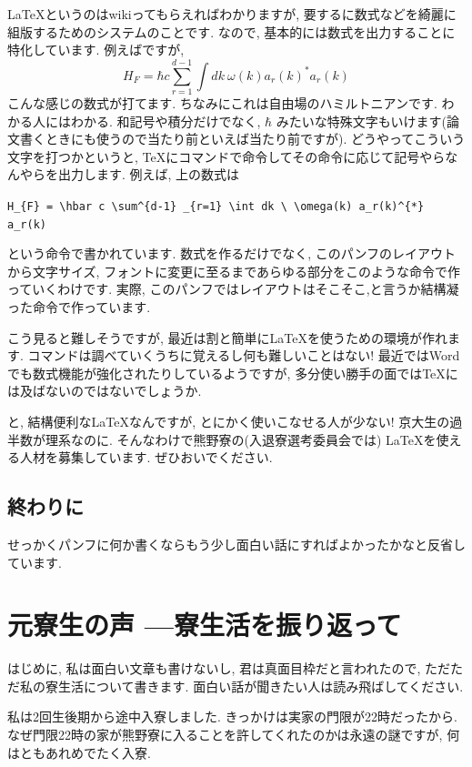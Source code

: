 \documentclass[10pt,b5jsbook,dvips,dvipdfmx,openany]{jsbook}
\theoremstyle{definition}
\begin{document}
		\LaTeX というのはwikiってもらえればわかりますが, 要するに数式などを綺麗に組版するためのシステムのことです. なので, 基本的には数式を出力することに特化しています. 例えばですが, 
		\[
     	 	H_{F} = \hbar c \sum^{d-1} _{r=1} \int dk \ \omega(k) a_r(k)^{*} a_r(k) 
      		\]
		こんな感じの数式が打てます. ちなみにこれは自由場のハミルトニアンです. わかる人にはわかる. 和記号や積分だけでなく, $ \hbar $ みたいな特殊文字もいけます(論文書くときにも使うので当たり前といえば当たり前ですが). どうやってこういう文字を打つかというと, \TeX にコマンドで命令してその命令に応じて記号やらなんやらを出力します. 例えば, 上の数式は 
		
		\verb|H_{F} = \hbar c \sum^{d-1} _{r=1} \int dk \ \omega(k) a_r(k)^{*} a_r(k) | 
		
		という命令で書かれています. 数式を作るだけでなく, このパンフのレイアウトから文字サイズ, フォントに変更に至るまであらゆる部分をこのような命令で作っていくわけです. 実際, このパンフではレイアウトはそこそこ,と言うか結構凝った命令で作っています. 
		
		こう見ると難しそうですが, 最近は割と簡単に\LaTeX を使うための環境が作れます. コマンドは調べていくうちに覚えるし何も難しいことはない! 最近ではWordでも数式機能が強化されたりしているようですが, 多分使い勝手の面では\TeX には及ばないのではないでしょうか. 
		
		と, 結構便利な\LaTeX なんですが, とにかく使いこなせる人が少ない! 京大生の過半数が理系なのに. そんなわけで熊野寮の(入退寮選考委員会では) \LaTeX を使える人材を募集しています. ぜひおいでください. 
		
		
		\subsection{終わりに}
		せっかくパンフに何か書くならもう少し面白い話にすればよかったかなと反省しています. 
		
	
	
	\section{元寮生の声 ---寮生活を振り返って}
	 はじめに, 私は面白い文章も書けないし, 君は真面目枠だと言われたので, ただただ私の寮生活について書きます. 面白い話が聞きたい人は読み飛ばしてください. 

 	私は2回生後期から途中入寮しました. きっかけは実家の門限が22時だったから. なぜ門限22時の家が熊野寮に入ることを許してくれたのかは永遠の謎ですが, 何はともあれめでたく入寮. 
\end{document}
